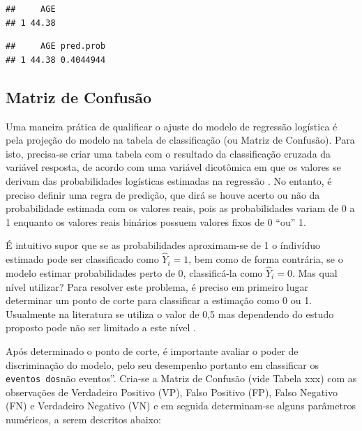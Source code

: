 \documentclass[12pt,brazil,]{book}
\newenvironment{Shaded}{\begin{snugshade}}{\end{snugshade}}
\newcommand{\DataTypeTok}[1]{\textcolor[rgb]{0.13,0.29,0.53}{#1}}
\newcommand{\KeywordTok}[1]{\textcolor[rgb]{0.13,0.29,0.53}{\textbf{#1}}}
\newcommand{\NormalTok}[1]{#1}
\newcommand{\OperatorTok}[1]{\textcolor[rgb]{0.81,0.36,0.00}{\textbf{#1}}}
\newcommand{\StringTok}[1]{\textcolor[rgb]{0.31,0.60,0.02}{#1}}
\begin{document}
\begin{verbatim}
##     AGE
## 1 44.38
\end{verbatim}

\begin{Shaded}
\end{Shaded}

\begin{verbatim}
##     AGE pred.prob
## 1 44.38 0.4044944
\end{verbatim}

\hypertarget{matriz-de-confusao}{%
\subsection{Matriz de Confusão}\label{matriz-de-confusao}}

Uma maneira prática de qualificar o ajuste do modelo de regressão
logística é pela projeção do modelo na tabela de classificação (ou
Matriz de Confusão). Para isto, precisa-se criar uma tabela com o
resultado da classificação cruzada da variável resposta, de acordo com
uma variável dicotômica em que os valores se derivam das probabilidades
logísticas estimadas na regressão \autocite{Hosmer2000}. No entanto, é
preciso definir uma regra de predição, que dirá se houve acerto ou não
da probabilidade estimada com os valores reais, pois as probabilidades
variam de 0 a 1 enquanto os valores reais binários possuem valores fixos
de 0 ``ou'' 1.

É intuitivo supor que se as probabilidades aproximam-se de 1 o índivíduo
estimado pode ser classificado como \(\hat Y_i=1\), bem como de forma
contrária, se o modelo estimar probabilidades perto de 0, classificá-la
como \(\hat Y_i=0\). Mas qual nível utilizar? Para resolver este
problema, é preciso em primeiro lugar determinar um ponto de corte para
classificar a estimação como 0 ou 1. Usualmente na literatura se utiliza
o valor de 0,5 mas dependendo do estudo proposto pode não ser limitado a
este nível \autocite{Hosmer2000}.

Após determinado o ponto de corte, é importante avaliar o poder de
discriminação do modelo, pelo seu desempenho portanto em classificar os
\texttt{eventos\textquotesingle{}\textquotesingle{}\ dos}não eventos''.
Cria-se a Matriz de Confusão (vide Tabela xxx) com as observações de
Verdadeiro Positivo (VP), Falso Positivo (FP), Falso Negativo (FN) e
Verdadeiro Negativo (VN) e em seguida determinam-se alguns parâmetros
numéricos, a serem descritos abaixo:
\end{document}
